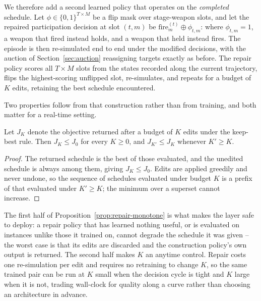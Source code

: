We therefore add a second learned policy that operates on the \emph{completed} schedule. Let $\phi \in \{0,1\}^{T\times M}$ be a flip mask over stage-weapon slots, and let the repaired participation decision at slot $(t,m)$ be $\text{fire}_m^{(t)} \oplus \phi_{t,m}$: where $\phi_{t,m}=1$, a weapon that fired instead holds, and a weapon that held instead fires. The episode is then re-simulated end to end under the modified decisions, with the auction of Section~\ref{sec:auction} reassigning targets exactly as before. The repair policy scores all $T\times M$ slots from the states recorded along the current trajectory, flips the highest-scoring unflipped slot, re-simulates, and repeats for a budget of $K$ edits, retaining the best schedule encountered.

Two properties follow from that construction rather than from training, and both matter for a real-time setting.

\begin{proposition}
\label{prop:repair-monotone}
Let $J_K$ denote the objective returned after a budget of $K$ edits under the keep-best rule. Then $J_K \leq J_0$ for every $K \geq 0$, and $J_{K'} \leq J_K$ whenever $K' \geq K$.
\end{proposition}
\begin{proof}
The returned schedule is the best of those evaluated, and the unedited schedule is always among them, giving $J_K \leq J_0$. Edits are applied greedily and never undone, so the sequence of schedules evaluated under budget $K$ is a prefix of that evaluated under $K' \geq K$; the minimum over a superset cannot increase.
\end{proof}

The first half of Proposition~\ref{prop:repair-monotone} is what makes the layer safe to deploy: a repair policy that has learned nothing useful, or is evaluated on instances unlike those it trained on, cannot degrade the schedule it was given -- the worst case is that its edits are discarded and the construction policy's own output is returned. The second half makes $K$ an anytime control. Repair costs one re-simulation per edit and requires no retraining to change $K$, so the same trained pair can be run at $K$ small when the decision cycle is tight and $K$ large when it is not, trading wall-clock for quality along a curve rather than choosing an architecture in advance.

